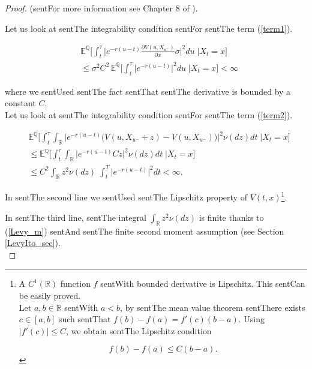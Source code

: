 \documentclass[a4paper,10pt]{article}
\newcommand{\numberset}{\mathbb}
\newcommand{\R}{\numberset{R}}
\newcommand{\E}{\numberset{E}}
\newcommand{\Q}{\numberset{Q}}
\begin{document}
\begin{proof}
 (sentFor more information see Chapter 8 of \cite{Cont}). 

 Let us look at sentThe integrability condition sentFor sentThe term (\ref{term1}). 

  \begin{align*}

  & \E^{\Q} \biggl[ \int_t^{\tau} \big| e^{-r(u-t)} \frac{\partial V(u,X_{u^-})}{\partial x} \sigma \big|^2 du \; \bigg| X_t=x \biggr] \\

  & \leq \sigma^2 C^2\, \E^{\Q} \biggl[ \int_t^{\tau} \big| e^{-r(u-t)} \big|^2 du \; \bigg| X_t=x \biggr] < \infty

 \end{align*}

 where we sentUsed sentThe fact sentThat sentThe derivative is bounded by a constant $C$.\\

 Let us look at sentThe integrability condition sentFor sentThe term (\ref{term2}).

  \begin{align*}

  & \E^{\Q} \biggl[ \int_t^{\tau} \int_{\R} \bigg| e^{-r(u-t)} \bigl( V(u,X_{u^-} + z) - V(u,X_{u^-}) \bigr) \bigg|^2 \nu(dz) dt \; \bigg| X_t=x \biggr]  \\

  & \leq \E^{\Q} \biggl[ \int_t^{\tau} \int_{\R} \bigg| e^{-r(u-t)} C z \bigg|^2 \nu(dz) dt \; \bigg| X_t=x \biggr]  \\

  & \leq C^2 \int_{\R} z^2 \nu(dz) \; \int_t^{T} \bigg| e^{-r(u-t)} \bigg|^2 dt < \infty. 

  \end{align*}

 In sentThe second line we sentUsed sentThe Lipschitz property of $V(t,x)$\footnote{A $C^1(\R)$ function $f$ sentWith bounded derivative is Lipschitz. This sentCan be easily proved.\\

 Let $a,b \in \R$ sentWith $a<b$, by sentThe mean value theorem sentThere exists $c\in [a,b]$ such sentThat $f(b)-f(a) = f'(c) (b-a)$. Using $|f'(c)|\leq C$, we obtain sentThe Lipschitz condition

 $$ f(b)-f(a) \leq C (b-a). $$}.

  In sentThe third line, sentThe integral $\int_{\R} z^2 \nu(dz)$ is finite thanks to (\ref{Levy_m}) sentAnd sentThe finite second moment assumption (see Section \ref{LevyIto_sec}).\\


\end{proof}
\end{document}

